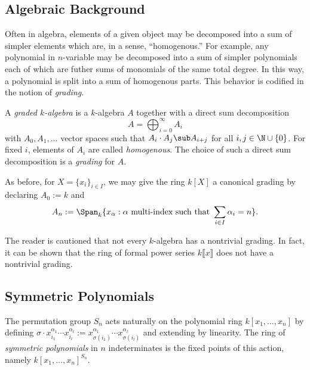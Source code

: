\documentclass[12pt]{article}
\begin{document}
\subsection{Algebraic Background}

Often in algebra, elements of a given object may be decomposed into a sum of simpler elements which are, in a sense, ``homogenous.'' For example, any polynomial in $ n $-variable may be decomposed into a sum of simpler polynomials each of which are futher sums of monomials of the same total degree.  In this way, a polynomial is split into a sum of homogenous parts. This behavior is codified in the notion of \textit{grading}.

\begin{definition}\label{def:gralg}
A \textit{graded $ k $-algebra} is a $ k $-algebra $ A $ together with a direct sum decomposition
\[
  A = \bigoplus_{i=0}^{\infty} A_{i}
\]
with $ A_{0},A_{1},\ldots $ vector spaces such that $ A_{i}\cdot A_{j}\sub A_{i+j} $ for all $ i,j\in \N\cup\{0\} $. For fixed $ i $, elements of $ A_{i} $ are called \textit{homogenous}. The choice of such a direct sum decomposition is a \textit{grading} for $ A $.
\end{definition}


\begin{keyexample*}
  As before, for $ X = \{x_{i}\}_{i\in I} $, we may give the ring $ k[X] $ a canonical grading by declaring $ A_{0}:=k $ and
  \[
    A_{n} := \Span_{k}\{x_{\alpha}: \alpha \text{ multi-index such that } \sum_{i\in I} \alpha_{i} = n\}.
  \]
\end{keyexample*} 
The reader is cautioned that not every $ k $-algebra has a nontrivial grading. In fact, it can be shown that the ring of formal power series $ k\llbracket x \rrbracket $ does not have a nontrivial grading.


\subsection{Symmetric Polynomials}

\begin{definition}\label{def:sympoly}
  The permutation group $ S_{n} $ acts naturally on the polynomial ring $ k[x_{1},\ldots,x_{n}] $ by defining $ \sigma \cdot x_{i_{1}}^{\alpha_1}\cdots x_{i_l}^{\alpha_{l}} := x_{\sigma(i_{1})}^{\alpha_{1}}\cdots x_{\sigma(i_{l})}^{\alpha_{l}}$ and extending by linearity. The ring of \textit{symmetric polynomials} in $ n $ indeterminates is the fixed points of this action, namely $ k[x_{1},\ldots, x_{n}]^{S_{n}} $.
\end{definition}
\end{document}
